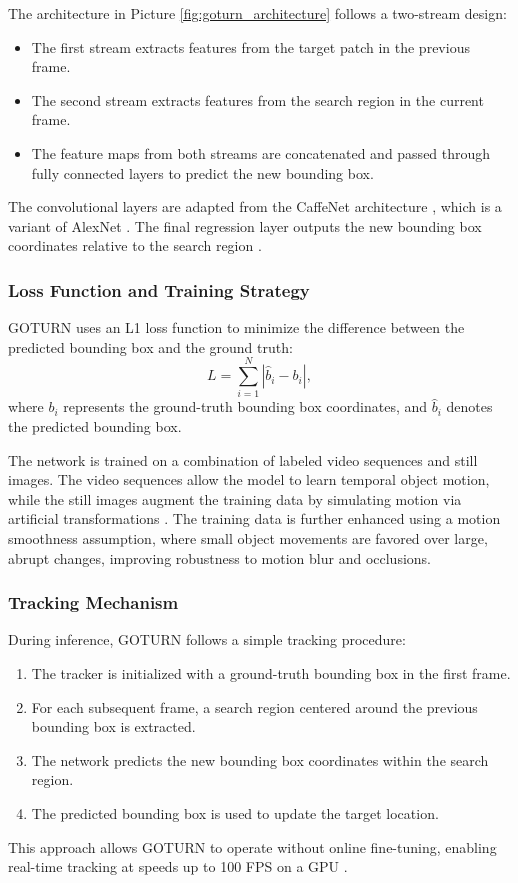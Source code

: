 The architecture in Picture \ref{fig:goturn_architecture} follows a two-stream design:
\begin{itemize}
    \item The first stream extracts features from the target patch in the previous frame.
    \item The second stream extracts features from the search region in the current frame.
    \item The feature maps from both streams are concatenated and passed through fully connected layers to predict the new bounding box.
\end{itemize}

The convolutional layers are adapted from the CaffeNet architecture \cite{jia2014caffe}, which is a variant of AlexNet \cite{krizhevskyalexnet}. The final regression layer outputs the new bounding box coordinates relative to the search region \cite{held2016learning}.

\subsubsection{Loss Function and Training Strategy}
GOTURN uses an L1 loss function to minimize the difference between the predicted bounding box and the ground truth:
\begin{equation}
    L = \sum_{i=1}^{N} \left| \hat{b}_i - b_i \right|,
\end{equation}
where $b_i$ represents the ground-truth bounding box coordinates, and $\hat{b}_i$ denotes the predicted bounding box.

The network is trained on a combination of labeled video sequences and still images. The video sequences allow the model to learn temporal object motion, while the still images augment the training data by simulating motion via artificial transformations \cite{held2016learning}. The training data is further enhanced using a motion smoothness assumption, where small object movements are favored over large, abrupt changes, improving robustness to motion blur and occlusions.

\subsubsection{Tracking Mechanism}
During inference, GOTURN follows a simple tracking procedure:
\begin{enumerate}
    \item The tracker is initialized with a ground-truth bounding box in the first frame.
    \item For each subsequent frame, a search region centered around the previous bounding box is extracted.
    \item The network predicts the new bounding box coordinates within the search region.
    \item The predicted bounding box is used to update the target location.
\end{enumerate}
This approach allows GOTURN to operate without online fine-tuning, enabling real-time tracking at speeds up to 100 FPS on a GPU \cite{held2016learning}.

